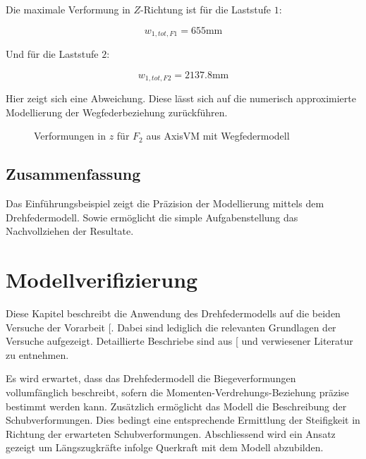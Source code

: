 \documentclass[
  11pt,
  letterpaper,
]{scrreprt}
\begin{document}
Die maximale Verformung in \(Z\)-Richtung ist für die Laststufe \(1\):

\[
w_{1,tot,F1} = 655 \text{mm}
\]

Und für die Laststufe \(2\):

\[
w_{1,tot,F2} = 2137.8 \text{mm}
\]

Hier zeigt sich eine Abweichung. Diese lässt sich auf die numerisch
approximierte Modellierung der Wegfederbeziehung zurückführen.

\begin{figure}[H]


\caption{\label{fig-f2-wegfeder}Verformungen in \(z\) für \(F_2\) aus
AxisVM mit Wegfedermodell}

\end{figure}%

\section{Zusammenfassung}\label{zusammenfassung}

Das Einführungsbeispiel zeigt die Präzision der Modellierung mittels dem
Drehfedermodell. Sowie ermöglicht die simple Aufgabenstellung das
Nachvollziehen der Resultate.


\chapter{Modellverifizierung}\label{modellverifizierung}

Diese Kapitel beschreibt die Anwendung des Drehfedermodells auf die
beiden Versuche der Vorarbeit {[}\citeproc{ref-gitz_ansatze_2024}{1}{]}.
Dabei sind lediglich die relevanten Grundlagen der Versuche aufgezeigt.
Detaillierte Beschriebe sind aus
{[}\citeproc{ref-gitz_ansatze_2024}{1}{]} und verwiesener Literatur zu
entnehmen.

Es wird erwartet, dass das Drehfedermodell die Biegeverformungen
vollumfänglich beschreibt, sofern die Momenten-Verdrehungs-Beziehung
präzise bestimmt werden kann. Zusätzlich ermöglicht das Modell die
Beschreibung der Schubverformungen. Dies bedingt eine entsprechende
Ermittlung der Steifigkeit in Richtung der erwarteten Schubverformungen.
Abschliessend wird ein Ansatz gezeigt um Längszugkräfte infolge
Querkraft mit dem Modell abzubilden.
\end{document}
